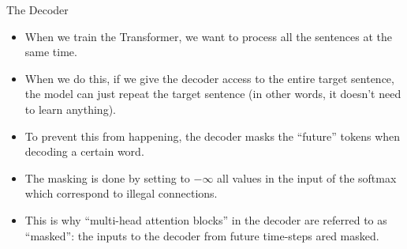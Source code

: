 \documentclass[handout]{beamer}
\begin{document}
\begin{frame}{The Decoder}
\begin{scriptsize}
\begin{itemize}
 \item When we train the Transformer, we want to process all the sentences at the same time. 
 
 \item When we do this, if we give the decoder access to the entire target sentence, the model can just repeat the target sentence (in other words, it doesn't need to learn anything).
 
 \item To prevent this from happening, the decoder masks the ``future'' tokens when decoding a certain word.

  \item The masking is done by setting to $- \infty$ all values in the input of the softmax which correspond to illegal connections.
 \item This is why ``multi-head attention blocks'' in the decoder are referred to as ``masked'': the inputs to the decoder from future time-steps ared masked.

\end{itemize}

\end{scriptsize}

\end{frame}
\end{document}
